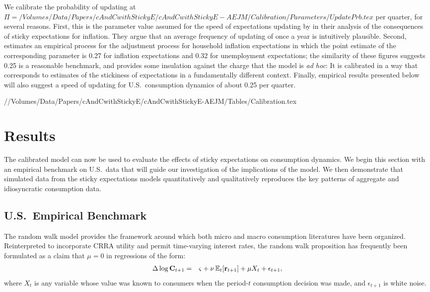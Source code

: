 We calibrate the probability of updating at $\Pi=  {/Volumes/Data/Papers/cAndCwithStickyE/cAndCwithStickyE-AEJM/Calibration/Parameters/UpdatePrb.tex}$ per quarter, for several reasons.  First, this is the parameter value assumed for the speed of expectations updating by \cite{mrSlumps} in their analysis of the consequences of sticky expectations for inflation.  They argue that an average frequency of updating of once a year is intuitively plausible.  Second, \cite{carroll:epidemicinflQJE} estimates an empirical process for the adjustment process for household inflation expectations in which the point estimate of the corresponding parameter is 0.27 for inflation expectations and 0.32 for unemployment expectations; the similarity of these figures suggests 0.25 is a reasonable benchmark, and provides some insulation against the charge that the model is {\it ad hoc}: It is calibrated in a way that corresponds to estimates of the stickiness of expectations in a fundamentally different context.  Finally, empirical results presented below will also suggest a speed of updating for U.S.\ consumption dynamics of about 0.25 per quarter.

//Volumes/Data/Papers/cAndCwithStickyE/cAndCwithStickyE-AEJM/Tables/Calibration.tex


\section{Results}\label{sec:Results}

The calibrated model can now be used to evaluate the effects of sticky expectations on consumption dynamics.  We begin this section with an empirical benchmark on U.S.\ data that will guide our investigation of the implications of the model.  We then demonstrate that simulated data from the sticky expectations models quantitatively and qualitatively reproduces the key patterns of aggregate and idiosyncratic consumption data.

\subsection{U.S.\ Empirical Benchmark}
\label{sec:EmpBenchmark}

The random walk model provides the framework around which both micro and macro consumption literatures have been organized.  Reinterpreted to incorporate CRRA utility and permit time-varying interest rates, the random walk proposition has frequently been formulated as a claim that $\mu=0$ in regressions of the form:
\begin{eqnarray}
  \label{eq:RandomWalkCRRA}
  \Delta \log \mathbf{C}_{t+1} & = & \varsigma+\nu \operatorname{\mathbb{E}}_{t}[\mathbf{r}_{t+1}]+\mu X_{t}+\epsilon_{t+1},
\end{eqnarray}
where $X_{t}$ is any variable whose value was known to consumers
when the period-$t$ consumption decision was made, and $\epsilon_{t+1}$
is white noise.

